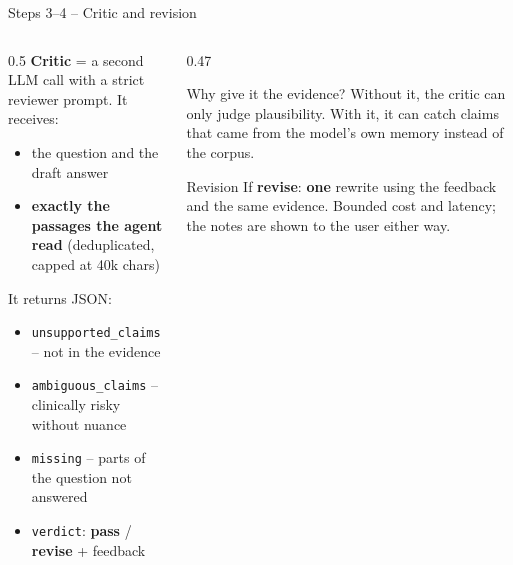 \documentclass[aspectratio=169,11pt]{beamer}
\newcommand{\good}[1]{{\color{okgreen}\textbf{#1}}}
\newcommand{\warn}[1]{{\color{warnorange}\textbf{#1}}}
\begin{document}
\begin{frame}{Steps 3--4 -- Critic and revision}
  \begin{columns}[T]
    \begin{column}{0.5\textwidth}
      \small
      \textbf{Critic} = a second LLM call with a strict reviewer prompt. It receives:
      \begin{itemize}
        \item the question and the draft answer
        \item \textbf{exactly the passages the agent read} (deduplicated, capped at 40k chars)
      \end{itemize}
      It returns JSON:
      \begin{itemize}
        \item \texttt{unsupported\_claims} -- not in the evidence
        \item \texttt{ambiguous\_claims} -- clinically risky without nuance
        \item \texttt{missing} -- parts of the question not answered
        \item \texttt{verdict}: \good{pass} / \warn{revise} + feedback
      \end{itemize}
    \end{column}
    \begin{column}{0.47\textwidth}
      \begin{block}{Why give it the evidence?}
        \small
        Without it, the critic can only judge plausibility. With it, it can catch claims
        that came from the model's own memory instead of the corpus.
      \end{block}
      \vspace{0.4em}
      \begin{block}{Revision}
        \small
        If \warn{revise}: \textbf{one} rewrite using the feedback and the same evidence.
        Bounded cost and latency; the notes are shown to the user either way.
      \end{block}
    \end{column}
  \end{columns}
\end{frame}
\end{document}
